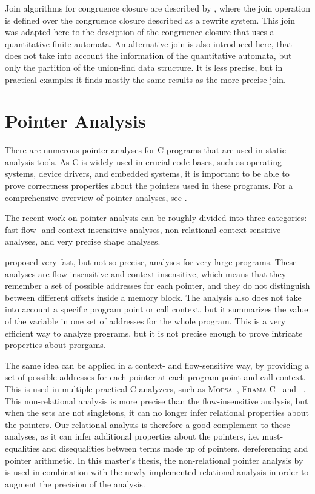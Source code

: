 Join algorithms for congruence closure are described by \textcite{join},
where the join operation is defined over the congruence closure described
as a rewrite system.
This join was adapted here to the desciption of the congruence closure that uses a quantitative finite automata.
An alternative join is also introduced here, that does not take into account the information of the
quantitative automata, but only the partition of the union-find data structure.
It is less precise, but in practical examples it finds mostly the same results as the more precise join.


\section{Pointer Analysis}

There are numerous pointer analyses for C programs that are used in static analysis tools.
As C is widely used in crucial code bases, such as operating systems, device drivers, and embedded systems,
it is important to be able to prove correctness properties about the pointers used in these programs.
For a comprehensive overview of pointer analyses, see \textcite{pointeranalysis}.

The recent work on pointer analysis can be roughly divided into three categories:
fast flow- and context-insensitive analyses, non-relational context-sensitive analyses, and very precise shape analyses.

\textcite{Andersen,Steensgaard} proposed very fast, but not so precise, analyses for very large programs.
These analyses are flow-insensitive and context-insensitive, which means that they remember a set of possible
addresses for each pointer, and they do not distinguish between different offsets inside a memory block.
The analysis also does not take into account a specific program point or call context, but it summarizes the
value of the variable in one set of addresses for the whole program.
This is a very efficient way to analyze programs, but it is not precise enough to prove intricate properties about prorgams.

The same idea can be applied in a context- and flow-sensitive way, by providing a set of possible addresses for each pointer at each program point and call context.
This is used in multiple practical C analyzers, such as \textsc{Mopsa}~\cite{mopsa}, \textsc{Frama-C}~\cite{framac,Bühler2024} and \goblint~\cite{goblint}.
This non-relational analysis is more precise than the flow-insensitive analysis, but when the sets are not singletons,
it can no longer infer relational properties about the pointers.
Our relational analysis is therefore a good complement to these analyses, as it can infer additional
properties about the pointers, i.e. must-equalities and disequalities between terms made up of pointers, dereferencing and pointer arithmetic.
In this master's thesis, the non-relational pointer analysis by \textcite{goblint} is used in combination
with the newly implemented relational analysis in order to augment the precision of the analysis.


